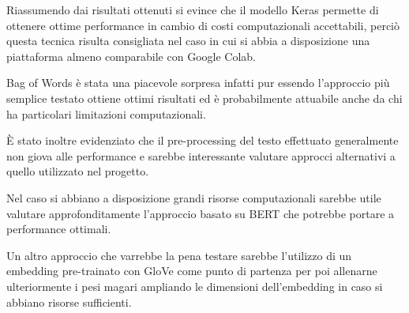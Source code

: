 
Riassumendo dai risultati ottenuti si evince che il modello Keras permette di
ottenere ottime performance in cambio di costi computazionali accettabili,
perciò questa tecnica risulta consigliata nel caso in cui si abbia a
disposizione una piattaforma almeno comparabile con Google Colab.

Bag of Words è stata una piacevole sorpresa infatti pur essendo l'approccio più
semplice testato ottiene ottimi risultati ed è probabilmente attuabile anche
da chi ha particolari limitazioni computazionali.

È stato inoltre evidenziato che il pre-processing del testo effettuato
generalmente non giova alle performance e sarebbe interessante valutare approcci
alternativi a quello utilizzato nel progetto.

Nel caso si abbiano a disposizione grandi risorse computazionali sarebbe utile
valutare approfonditamente l'approccio basato su BERT che potrebbe portare a
performance ottimali.

Un altro approccio che varrebbe la pena testare sarebbe l'utilizzo di un embedding
pre-trainato con GloVe come punto di partenza per poi allenarne ulteriormente i
pesi magari ampliando le dimensioni dell'embedding in caso si abbiano risorse sufficienti.
